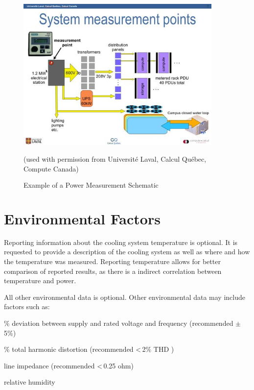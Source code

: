 \begin{figure}
\centering
\includegraphics[width=4in]{fig3-7}
\caption{Example of a Power Measurement Schematic}
(used with permission from Universit\'{e} Laval, Calcul Qu\'{e}bec, Compute Canada)
\label{fig:powmeasschem}
\end{figure}


\section{Environmental Factors}
\label{sec:EF}

Reporting information about the cooling system temperature is optional.
It is requested to provide a description of the cooling system as well as where and how the temperature was measured.
Reporting temperature allows for better comparison of reported results, as there is a indirect correlation between temperature and power.

All other environmental data is optional.
Other environmental data may include factors such as:

\begin{packed_item}
\item[{-}]
\% deviation between supply and rated voltage and frequency (recommended $\pm$\,5\%)
\item[{-}]
\% total harmonic distortion (recommended \textless\,2\% THD )
\item[{-}]
line impedance (recommended \textless\,0.25 ohm)
\item[{-}]
relative humidity
\end{packed_item}


